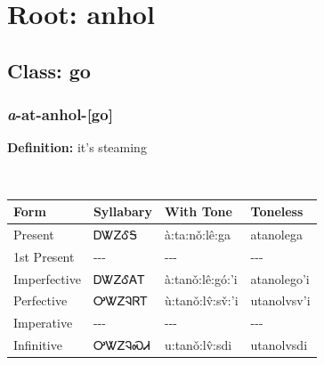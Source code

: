 \needspace{4in}
\section*{Root: anhol}
\nopagebreak
{}
\needspace{3in}
\subsection*{Class: go}
\nopagebreak
\needspace{2in}
\subsubsection*{\textit{a}{-}at{-}\textbf{anhol}{-}[go]}
\nopagebreak
\textbf{Definition: } it{\textquoteright}s steaming
\\[0.5em]
\begin{tabularx}{\textwidth}{l X X X}%
\toprule%
\textbf{Form}&\textbf{Syllabary}&\textbf{With Tone}&\textbf{Toneless}\\%
\midrule%
Present&ᎠᏔᏃᎴᎦ&à:ta:nǒ:lê:ga&atanolega\\%
1st Present&{-}{-}{-}&{-}{-}{-}&{-}{-}{-}\\%
Imperfective&ᎠᏔᏃᎴᎪᎢ&à:tanǒ:lê:gó:’i&atanolego’i\\%
Perfective&ᎤᏔᏃᎸᏒᎢ&ù:tanǒ:lv̂:sv̌:’i&utanolvsv’i\\%
Imperative&{-}{-}{-}&{-}{-}{-}&{-}{-}{-}\\%
Infinitive&ᎤᏔᏃᎸᏍᏗ&u:tanǒ:lv̂:sdi&utanolvsdi\\%
\bottomrule%
\end{tabularx}
\\[1em]
